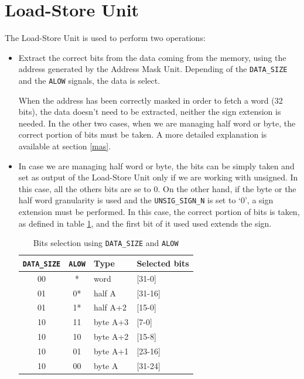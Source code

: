 \section{Load-Store Unit}
The Load-Store Unit is used to perform two operations:
\begin{itemize}
	\item Extract the correct bits from the data coming from the memory, using the address generated by the Address Mask Unit. Depending of the \texttt{DATA\_SIZE} and the \texttt{ALOW} signals, the data is select.
	
	When the address has been correctly masked in order to fetch a word (32 bits), the data doesn't need to be extracted, neither the sign extension is needed. In the other two cases, when we are managing half word or byte, the correct portion of bits must be taken. A more detailed explanation is available at section \ref{mas}.

	\item In case we are managing half word or byte, the bits can be simply taken and set as output of the Load-Store Unit only if we are working with unsigned. In this case, all the others bits are se to 0. On the other hand, if the byte or the half word granularity is used and the \texttt{UNSIG\_SIGN\_N} is set to `0', a sign extension must be performed. In this case, the correct portion of bits is taken, as defined in table \ref{tab:addr_selection}, and the first bit of it used used extends the sign.
	\begin{table}[H]
		\begin{center}
			\begin{tabular}{ |c| c | l | l|}
				\hline
				\texttt{DATA\_SIZE} & \texttt{ALOW} & \textbf{Type} & \textbf{Selected bits}\\
				\hline
				00 & * & word & [31-0]\\
				01 & 0* & half A & [31-16]\\
				01 & 1* & half A+2 & [15-0]\\
				10 & 11 & byte A+3 & [7-0]\\
				10 & 10 & byte A+2 & [15-8]\\
				10 & 01 & byte A+1 & [23-16]\\
				10 & 00 & byte A & [31-24]\\
				\hline
				
			\end{tabular}
			\caption{Bits selection using \texttt{DATA\_SIZE} and \texttt{ALOW}}
			\label{tab:addr_selection}
		\end{center}
	\end{table}

	
\end{itemize}
